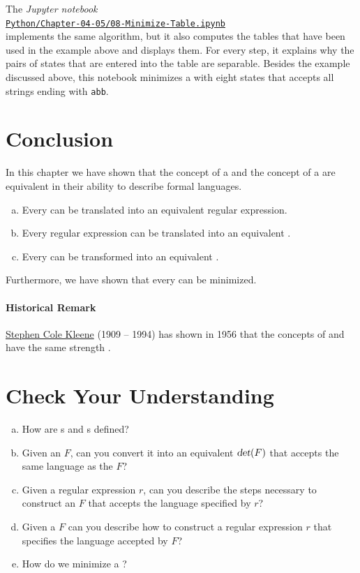 The \textsl{Jupyter notebook}
\\[0.2cm]
\hspace*{1.3cm}
\href{https://github.com/karlstroetmann/Formal-Languages/blob/master/Python/Chapter-04-05/08-Minimize-Table.ipynb}{\texttt{Python/Chapter-04-05/08-Minimize-Table.ipynb}}
\\[0.2cm]
implements the same algorithm, but it also computes the tables that have been used in the example above
and displays them.  For every step, it explains why the pairs of states that are entered into the table
are separable.  Besides the example discussed above, this notebook minimizes a  with eight
states that accepts all strings ending with \texttt{abb}.


\section{Conclusion}
In this chapter we have shown that the concept of a 
and the concept of a  are equivalent in their ability to describe formal languages.
\begin{enumerate}[(a)]
\item Every  can be translated into an equivalent regular expression.
\item Every regular expression can be translated into an equivalent .
\item Every  can be transformed into an equivalent .
\end{enumerate}
Furthermore, we have shown that every  can be minimized.

\paragraph{Historical Remark}
\href{http://en.wikipedia.org/wiki/Stephen_Cole_Kleene}{Stephen Cole Kleene} (1909 -- 1994) has shown in 1956 that the concepts of 
 and  have the same strength
\cite{kleene:1956}.

\section{Check Your Understanding}
\begin{enumerate}[(a)]
\item How are s and s defined?
\item Given an  $F$, can you convert it into an equivalent 
      $\textsl{det}(F)$ that accepts the same language as the  $F$?
\item Given a regular expression $r$, can you describe the steps necessary to construct an 
       $F$ that accepts the language specified by $r$?
\item Given a  $F$ can you describe how to construct a regular expression $r$
      that specifies the language accepted by $F$?
\item How do we minimize a ?
\end{enumerate}

